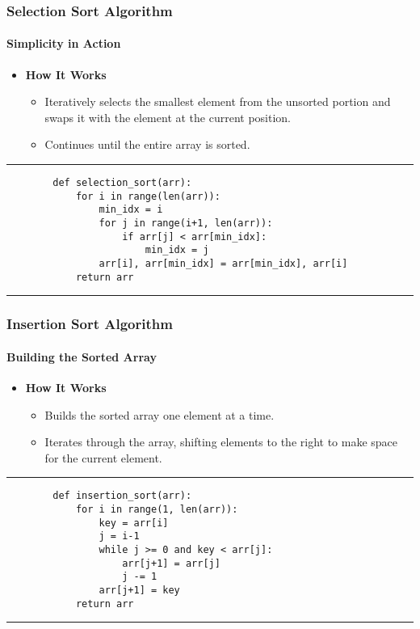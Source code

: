 \documentclass[compress,12pt,bookmark]{beamer}
\begin{document}
\begin{frame}[fragile]
    \frametitle{Selection Sort Algorithm}
    \framesubtitle{Simplicity in Action}

    \begin{itemize}
        \item \textbf{How It Works}
              \begin{itemize}
                  \item Iteratively selects the smallest element from the unsorted portion and swaps it with the element at the current position.
                  \item Continues until the entire array is sorted.
              \end{itemize}
    \end{itemize}

    \rule{\textwidth}{1pt}
    \scriptsize
    \begin{verbatim}
        def selection_sort(arr):
            for i in range(len(arr)):
                min_idx = i
                for j in range(i+1, len(arr)):
                    if arr[j] < arr[min_idx]:
                        min_idx = j
                arr[i], arr[min_idx] = arr[min_idx], arr[i]
            return arr
    \end{verbatim}
    \rule{\textwidth}{1pt}
\end{frame}

\begin{frame}[fragile]
    \frametitle{Insertion Sort Algorithm}
    \framesubtitle{Building the Sorted Array}

    \begin{itemize}
        \item \textbf{How It Works}
              \begin{itemize}
                  \item Builds the sorted array one element at a time.
                  \item Iterates through the array, shifting elements to the right to make space for the current element.
              \end{itemize}
    \end{itemize}

    \rule{\textwidth}{1pt}
    \scriptsize
    \begin{verbatim}
        def insertion_sort(arr):
            for i in range(1, len(arr)):
                key = arr[i]
                j = i-1
                while j >= 0 and key < arr[j]:
                    arr[j+1] = arr[j]
                    j -= 1
                arr[j+1] = key
            return arr
    \end{verbatim}
    \rule{\textwidth}{1pt}
\end{frame}
\end{document}

